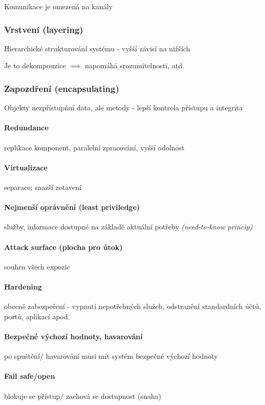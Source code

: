 \documentclass[10pt,a4paper]{article}
\begin{document}
Komunikace je omezená na kanály

\subsubsection*{Vrstvení (layering)}

Hierarchické strukturování systému - vyšší závisí na nižších

Je to dekompouzice $\implies$ napomáhá srozumitelnosti, atd.

\subsubsection*{Zapozdření (encapsulating)}

Objekty nezpřístupňuí data, ale metody - lepší kontrola přístupu a integrita

\paragraph*{Redundance} replikace komponent, paralelní zpracování, vyšší odolnost
\paragraph*{Virtualizace} separace; snazší zotavení

\paragraph*{Nejmenší oprávnění (least priviledge)} služby, informace dostupné na základě aktuální potřeby \textit{(need-to-know princip)}

\paragraph*{Attack surface (plocha pro útok)} souhrn všech expozic
\paragraph*{Hardening} obecně zabezpečení - vypnutí nepotřebných služeb, odstranění standardních účtů, portů, aplikací apod.

\paragraph*{Bezpečné výchozí hodnoty, havarování} po spuštění/ havarování musí mít systém bezpečné výchozí hodnoty
\paragraph*{Fail safe/open} blokuje se přístup/ zachová se dostupnost (snaha)
\end{document}
